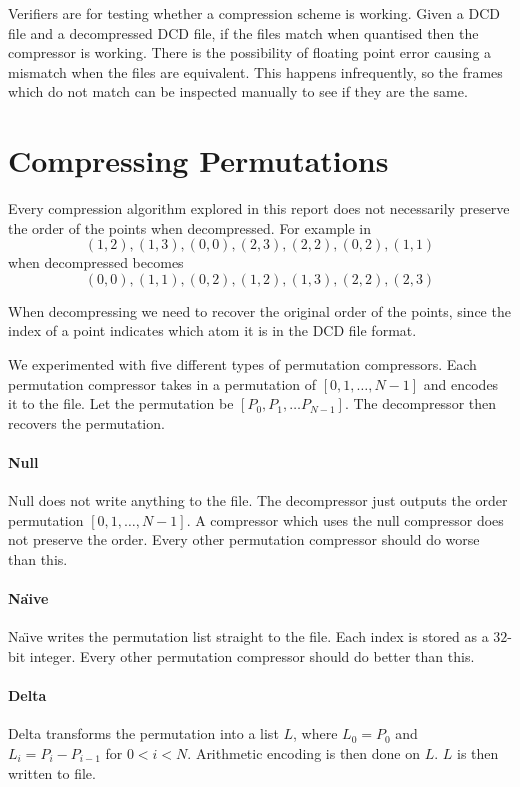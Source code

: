 \documentclass{report}
\begin{document}
Verifiers are for testing whether a compression scheme is working. Given a DCD
file and a decompressed DCD file, if the files match when quantised then the
compressor is working. There is the possibility of floating point error
causing a mismatch when the files are equivalent. This happens infrequently,
so the frames which do not match can be inspected manually to see if they are
the same.


\section{Compressing Permutations}
\label{sec:compr-perm}

Every compression algorithm explored in this report does not necessarily
preserve the order of the points when decompressed. For example in
\citep{devillers2000gci}
\[ (1, 2), (1, 3), (0, 0), (2, 3), (2, 2), (0, 2), (1, 1) \]
when decompressed becomes
\[ (0, 0), (1, 1), (0, 2), (1, 2), (1, 3), (2, 2), (2, 3) \]

When decompressing we need to recover the original order of the points, since
the index of a point indicates which atom it is in the DCD file format.

We experimented with five different types of permutation compressors. Each
permutation compressor takes in a permutation of $[0,1,\dots,N-1]$ and encodes
it to the file. Let the permutation be $[P_0, P_1, \dots P_{N-1}]$. The
decompressor then recovers the permutation.

\paragraph{Null}
Null does not write anything to the file. The decompressor just outputs the
order permutation $[0,1,\dots,N-1]$. A compressor which uses the null
compressor does not preserve the order. Every other permutation compressor
should do worse than this.

\paragraph{Na\"{\i}ve}
Na\"{\i}ve writes the permutation list straight to the file. Each index is
stored as a $32$-bit integer. Every other permutation compressor should do
better than this.

\paragraph{Delta}
Delta transforms the permutation into a list $L$, where $L_0 = P_0$ and $L_i =
P_i - P_{i-1}$ for $0 < i < N$. Arithmetic encoding is then done on $L$. $L$
is then written to file.
\end{document}
